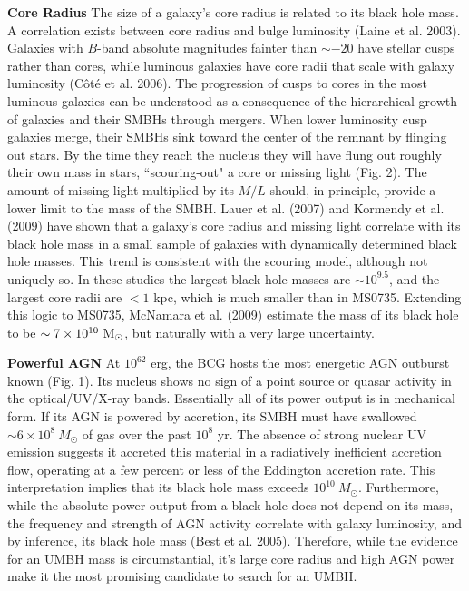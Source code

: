 \documentclass[12pt]{article}
\begin{document}
{\bf Core Radius}  The size of a galaxy's core radius is related to its black hole mass.  A correlation exists between core radius and bulge luminosity (Laine et al. 2003).  Galaxies with  $B$-band absolute magnitudes fainter than $\sim -20$ have stellar cusps rather than cores, while luminous galaxies have core radii that scale with galaxy luminosity (C\^ot\'e et al. 2006).  The progression of cusps to cores in the most luminous galaxies can be understood as a consequence of the hierarchical growth of  galaxies and their SMBHs through mergers.   When lower luminosity cusp galaxies merge, 
their SMBHs sink toward the center of the remnant by flinging out stars.  By the time they reach the nucleus they will have flung out roughly their own mass in stars, ``scouring-out" a core or missing light (Fig. 2).  The amount of missing light multiplied by its $M/L$ should, in principle, provide a lower limit to the mass of the SMBH.   Lauer et al. (2007) and Kormendy et al. (2009) have shown that a galaxy's core radius  and missing light correlate with its black hole mass in a small sample of galaxies with dynamically determined black hole masses.  This trend is consistent with the scouring model, although not uniquely so.    In these studies the largest black hole masses are $\sim 10^{9.5}$, and the largest core radii  are
$< 1$ kpc, which is much smaller than in MS0735. Extending this logic to MS0735, McNamara et al. (2009) estimate the mass of its black hole to be
$\sim 7\times 10^{10}~\rm M_\odot$, but naturally with a very large uncertainty.

{\bf Powerful AGN} At $10^{62}$ erg, the BCG hosts the most energetic AGN outburst known (Fig. 1). Its nucleus shows no sign of a point source or quasar activity in the optical/UV/X-ray bands.  Essentially all of its power output is in mechanical form.  If its AGN is powered by accretion, its SMBH must have swallowed $\sim 6\times 10^8~ M_\odot$ of gas over the past $10^8$ yr.  The absence of strong nuclear UV emission suggests it accreted this material in a radiatively inefficient accretion flow, operating at a few percent or less of the Eddington accretion rate.   This interpretation implies that its black hole mass exceeds $10^{10}~ M_\odot$.  Furthermore, while the absolute power output from a black hole does not depend on its mass, the frequency and strength of AGN activity 
correlate with galaxy luminosity, and by inference, its black hole mass (Best et al.  2005).  Therefore, while the evidence for an UMBH mass is circumstantial, it's large core radius and high AGN power make it the most promising candidate to search for an UMBH.  
\end{document}
